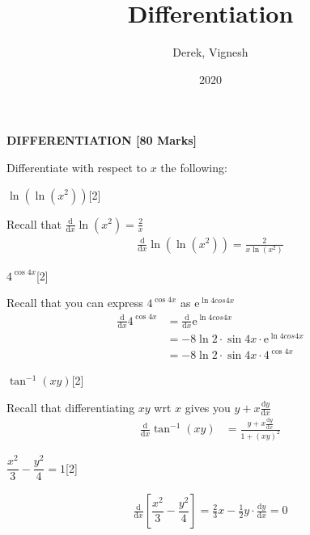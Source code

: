 \documentclass[12pt, a4 paper]{article}
\title{Differentiation}
\author{Derek, Vignesh}
\date{2020}
\begin{document}
\maketitle

\textbf{DIFFERENTIATION [80 Marks]}
\begin{outline}[enumerate]

 \1 Differentiate with respect to $x$ the following: %

 \2 $\ln (\ln ({x^2}))$\hfill[2]
 \begin{answer}
  Recall that $\frac{\mathrm{d}}{\mathrm{d}x}\ln(x^2)=\frac{2}{x}$
  \begin{align*}
   \frac{\mathrm{d}}{\mathrm{d}x}\ln (\ln ({x^2})) = \frac{2}{x\ln ({x^2})}
  \end{align*}
 \end{answer}

 \2 $4^{\cos 4x}$\hfill[2]
 \begin{answer}
  Recall that you can express $4^{\cos4x}$ as $\mathrm{e}^{\ln4cos4x}$
  \begin{align*}
   \frac{\mathrm{d}}{\mathrm{d}x}4^{\cos 4x} & =\frac{\mathrm{d}}{\mathrm{d}x}\mathrm{e}^{\ln4cos4x} \\
                                             & = -8\ln2 \cdot \sin4x \cdot \mathrm{e}^{\ln4cos4x}    \\
                                             & = -8\ln2 \cdot \sin4x \cdot 4^{\cos4x}
  \end{align*}
 \end{answer}

 \2 $\tan ^{ - 1}(xy)$\hfill[2]
 \begin{answer}
  Recall that differentiating $xy$ wrt $x$ gives you $y+x\frac{\mathrm{d}y}{\mathrm{d}x}$
  \begin{align*}
   \frac{\mathrm{d}}{\mathrm{d}x}\tan ^{ - 1}(xy) & = \frac{y+x\frac{\mathrm{d}y}{\mathrm{d}x}}{1+(xy)^2}
  \end{align*}
 \end{answer}

 \2 $\dfrac{{{x^2}}}{3} - \dfrac{{{y^2}}}{4} = 1$\hfill[2]
 \begin{answer}
  \begin{align*}
   \frac{\mathrm{d}}{\mathrm{d}x}\left[\dfrac{{{x^2}}}{3} - \dfrac{{{y^2}}}{4}\right] = \frac{2}{3}x-\frac{1}{2}y\cdot\frac{\mathrm{d}y}{\mathrm{d}x} = 0
  \end{align*}
 \end{answer}


\end{outline}
\end{document}

